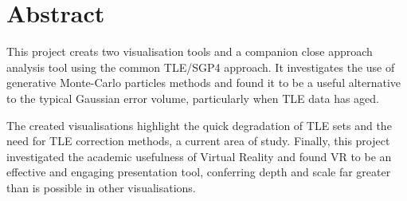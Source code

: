 \documentclass[12pt,openany,a4paper]{book}
\begin{document}
	
	\clearpage
	
	\chapter{Abstract}
	
	This project creats two visualisation tools and a companion close approach analysis tool using the common TLE/SGP4 approach. It investigates the use of generative Monte-Carlo particles methods and found it to be a useful alternative to the typical Gaussian error volume, particularly when TLE data has aged. \newline 
	
	The created visualisations highlight the quick degradation of TLE sets and the need for TLE correction methods, a current area of study. Finally, this project investigated the academic usefulness of Virtual Reality and found VR to be an effective and engaging presentation tool, conferring depth and scale far greater than is possible in other visualisations.
	
	
	
	
\end{document}
